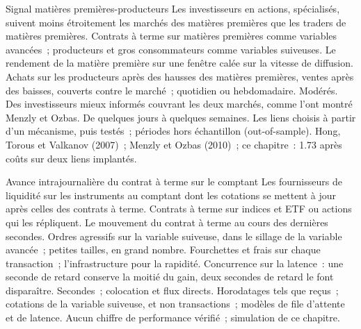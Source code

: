 \begin{strategyfile}{Signal matières premières-producteurs}\label{strat:s1:cross-asset-lead-lag:commodity}
 Les investisseurs en actions, spécialisés, suivent moins étroitement les marchés des matières premières que les traders de matières premières.
 Contrats à terme sur matières premières comme variables avancées~; producteurs et gros consommateurs comme variables suiveuses.
 Le rendement de la matière première sur une fenêtre calée sur la vitesse de diffusion.
 Achats sur les producteurs après des hausses des matières premières, ventes après des baisses, couverts contre le marché~; quotidien ou hebdomadaire.
 Modérés.
 Des investisseurs mieux informés couvrant les deux marchés, comme l'ont montré Menzly et Ozbas.
 De quelques jours à quelques semaines.
 Les liens choisis à partir d'un mécanisme, puis testés~; périodes hors échantillon (out-of-sample).
 Hong, Torous et Valkanov (2007)~; Menzly et Ozbas (2010)~; ce chapitre~: 1.73 après coûts sur deux liens implantés.
\end{strategyfile}

\begin{strategyfile}{Avance intrajournalière du contrat à terme sur le comptant}\label{strat:s1:cross-asset-lead-lag:futcash}
 Les fournisseurs de liquidité sur les instruments au comptant dont les cotations se mettent à jour après celles des contrats à terme.
 Contrats à terme sur indices et ETF ou actions qui les répliquent.
 Le mouvement du contrat à terme au cours des dernières secondes.
 Ordres agressifs sur la variable suiveuse, dans le sillage de la variable avancée~; petites tailles, en grand nombre.
 Fourchettes et frais sur chaque transaction~; l'infrastructure pour la rapidité.
 Concurrence sur la latence~: une seconde de retard conserve la moitié du gain, deux secondes de retard le font disparaître.
 Secondes~; colocation et flux directs.
 Horodatages tels que reçus~; cotations de la variable suiveuse, et non transactions~; modèles de file d'attente et de latence.
 Aucun chiffre de performance vérifié~; simulation de ce chapitre.
\end{strategyfile}

